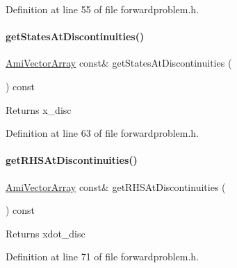 Definition at line 55 of file forwardproblem.\+h.

\mbox{\label{classamici_1_1_forward_problem_ae983e618f5d4161e92b3a86f4abd1048}} 
\paragraph{\texorpdfstring{getStatesAtDiscontinuities()}{getStatesAtDiscontinuities()}}
{\footnotesize\ttfamily \mbox{\hyperlink{classamici_1_1_ami_vector_array}{Ami\+Vector\+Array}} const\& get\+States\+At\+Discontinuities (\begin{DoxyParamCaption}{ }\end{DoxyParamCaption}) const}

\begin{DoxyReturn}{Returns}
x\+\_\+disc 
\end{DoxyReturn}


Definition at line 63 of file forwardproblem.\+h.

\mbox{\label{classamici_1_1_forward_problem_aaf71ce300e66a3034148c77417294897}} 
\paragraph{\texorpdfstring{getRHSAtDiscontinuities()}{getRHSAtDiscontinuities()}}
{\footnotesize\ttfamily \mbox{\hyperlink{classamici_1_1_ami_vector_array}{Ami\+Vector\+Array}} const\& get\+R\+H\+S\+At\+Discontinuities (\begin{DoxyParamCaption}{ }\end{DoxyParamCaption}) const}

\begin{DoxyReturn}{Returns}
xdot\+\_\+disc 
\end{DoxyReturn}


Definition at line 71 of file forwardproblem.\+h.

\mbox{\label{classamici_1_1_forward_problem_a082b9f4f0d51fc8e2bf46f9f8e700d06}} 
